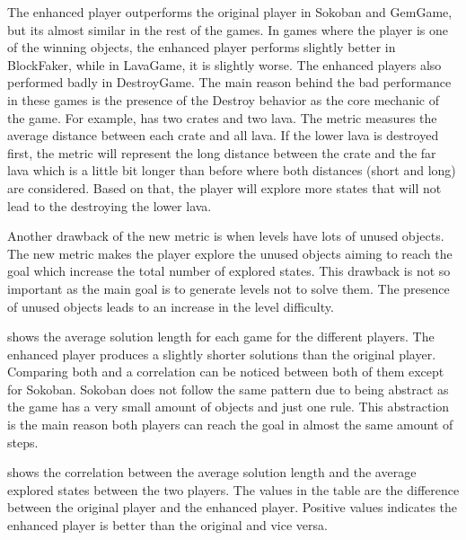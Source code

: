 The enhanced player outperforms the original player in Sokoban and GemGame, but its almost similar in the rest of the games. In games where the player is one of the winning objects, the enhanced player performs slightly better in BlockFaker, while in LavaGame, it is slightly worse. The enhanced players also performed badly in DestroyGame. The main reason behind the bad performance in these games is the presence of the Destroy behavior as the core mechanic of the game. For example,  has two crates and two lava. The metric measures the average distance between each crate and all lava. If the lower lava is destroyed first, the metric will represent the long distance between the crate and the far lava which is a little bit longer than before where both distances (short and long) are considered. Based on that, the player will explore more states that will not lead to the destroying the lower lava.


Another drawback of the new metric is when levels have lots of unused objects. The new metric makes the player explore the unused objects aiming to reach the goal which increase the total number of explored states. This drawback is not so important as the main goal is to generate levels not to solve them. The presence of unused objects leads to an increase in the level difficulty.\\\par

 shows the average solution length for each game for the different players. The enhanced player produces  a slightly shorter solutions than the original player. Comparing both  and  a correlation can be noticed between both of them except for Sokoban. Sokoban does not follow the same pattern due to being abstract as the game has a very small amount of objects and just one rule. This abstraction is the main reason both players can reach the goal in almost the same amount of steps.


 shows the correlation between the average solution length and the average explored states between the two players. The values in the table are the difference between the original player and the enhanced player. Positive values indicates the enhanced player is better than the original and vice versa.

